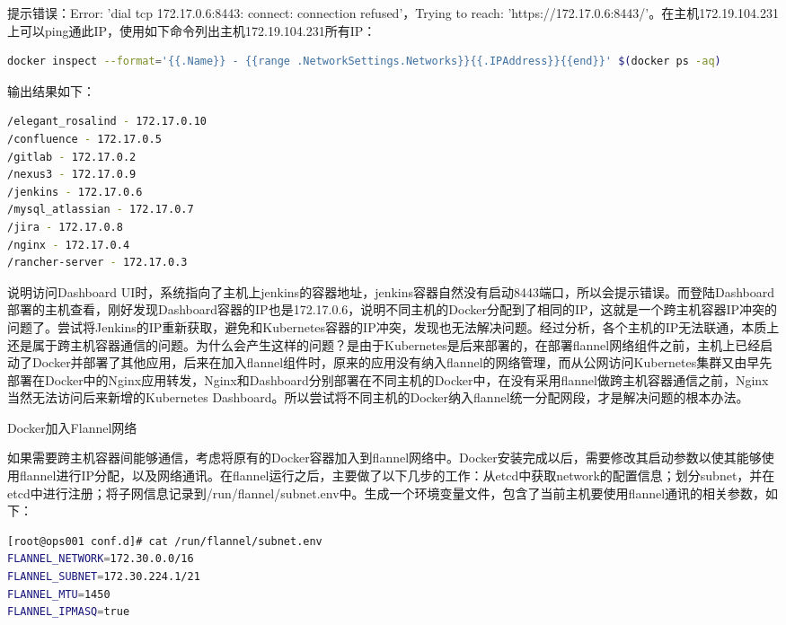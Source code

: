 \documentclass[8pt]{book}
\makeatletter
\numberwithin{dummy}{section}
\theoremstyle{ocrenumbox}
\theoremstyle{blacknumex}
\theoremstyle{blacknumbox}
\theoremstyle{ocrenum}
\renewcommand{\subsubsection}{\@startsection {subsubsection}{3}{\z@}
	{-2ex \@plus -0.1ex \@minus -.2ex}
	{.2ex \@plus.2ex }
	{\normalfont\small\sffamily\bfseries}}
\makeatother
\begin{document}
提示错误：Error: 'dial tcp 172.17.0.6:8443: connect: connection refused'，Trying to reach: 'https://172.17.0.6:8443/'。在主机172.19.104.231上可以ping通此IP，使用如下命令列出主机172.19.104.231所有IP：

\begin{lstlisting}[language=Bash]
docker inspect --format='{{.Name}} - {{range .NetworkSettings.Networks}}{{.IPAddress}}{{end}}' $(docker ps -aq)
\end{lstlisting}

输出结果如下：

\begin{lstlisting}[language=Bash]
/elegant_rosalind - 172.17.0.10
/confluence - 172.17.0.5
/gitlab - 172.17.0.2
/nexus3 - 172.17.0.9
/jenkins - 172.17.0.6
/mysql_atlassian - 172.17.0.7
/jira - 172.17.0.8
/nginx - 172.17.0.4
/rancher-server - 172.17.0.3
\end{lstlisting}

说明访问Dashboard UI时，系统指向了主机上jenkins的容器地址，jenkins容器自然没有启动8443端口，所以会提示错误。而登陆Dashboard部署的主机查看，刚好发现Dashboard容器的IP也是172.17.0.6，说明不同主机的Docker分配到了相同的IP，这就是一个跨主机容器IP冲突的问题了。尝试将Jenkins的IP重新获取，避免和Kubernetes容器的IP冲突，发现也无法解决问题。经过分析，各个主机的IP无法联通，本质上还是属于跨主机容器通信的问题。为什么会产生这样的问题？是由于Kubernetes是后来部署的，在部署flannel网络组件之前，主机上已经启动了Docker并部署了其他应用，后来在加入flannel组件时，原来的应用没有纳入flannel的网络管理，而从公网访问Kubernetes集群又由早先部署在Docker中的Nginx应用转发，Nginx和Dashboard分别部署在不同主机的Docker中，在没有采用flannel做跨主机容器通信之前，Nginx当然无法访问后来新增的Kubernetes Dashboard。所以尝试将不同主机的Docker纳入flannel统一分配网段，才是解决问题的根本办法。

\subsubsection{Docker加入Flannel网络}

如果需要跨主机容器间能够通信，考虑将原有的Docker容器加入到flannel网络中。Docker安装完成以后，需要修改其启动参数以使其能够使用flannel进行IP分配，以及网络通讯。在flannel运行之后，主要做了以下几步的工作：从etcd中获取network的配置信息；划分subnet，并在etcd中进行注册；将子网信息记录到/run/flannel/subnet.env中。生成一个环境变量文件，包含了当前主机要使用flannel通讯的相关参数，如下：

\begin{lstlisting}[language=Bash]
[root@ops001 conf.d]# cat /run/flannel/subnet.env
FLANNEL_NETWORK=172.30.0.0/16
FLANNEL_SUBNET=172.30.224.1/21
FLANNEL_MTU=1450
FLANNEL_IPMASQ=true
\end{lstlisting}
\end{document}
